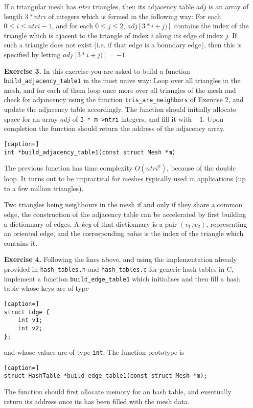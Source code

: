 \documentclass[a4paper,11pt]{article}
\begin{document}
\bigskip
 
If a triangular mesh has $ntri$ triangles, then its adjacency
table $adj$ is an array of length $3 * ntri$ of integers which is formed 
in the following way: For each $0 \leq i \leq ntri - 1$, and for each
$0 \leq j \leq 2$, $adj[3 * i + j)]$ contains the index of the 
triangle which is ajacent to the triangle of index $i$ along its edge of index $j$. 
If such a triangle does not exist (i.e. if that edge is a boundary edge), then
this is specified by letting $adj[3 * i + j)] = -1.$ 

\medskip

{\bf Exercise 3.} In this exercise you are asked to build a function {\tt build\_adjacency\_table1} 
in the most naive way: Loop over all triangles in the mesh, and for each of them
loop once more over all triangles of the mesh and check for adjancency using the 
function {\tt tris\_are\_neighbors} of Exercise 2, and update the adjacency table 
accordingly. The function should initially allocate space for an array $adj$ of
{\tt 3 * m->ntri} integers, and fill it with $-1.$ Upon completion the function should
return the address of the adjacency array. 
\begin{lstlisting}[caption=]
int *build_adjacency_table1(const struct Mesh *m)
\end{lstlisting}

\medskip

The previous function has time complexity $O(ntri^2)$, because of the double loop.
It turns out to be impractical for meshes typically used in applications (up to a 
few million triangles). 

\medskip

Two triangles being neighbours in the mesh if and only if they share a common edge, 
the construction of the adjacency table can be accelerated by first building a dictionnary 
of edges. A {\it key} of that dictionnary is a pair $(v_1,v_2)$, representing an oriented edge, 
and the corresponding {\it value} is the index of the triangle which contains it. 

\medskip

{\bf Exercise 4.} Following the lines above, and using the implementation already provided in 
{\tt hash\_tables.h} and {\tt hash\_tables.c} for generic hash tables in C, implement 
a function {\tt build\_edge\_table1} which initialises and then fill a hash table whose
keys are of type 
\begin{lstlisting}[caption=]
struct Edge {
	int v1;  
	int v2;
};
\end{lstlisting}
and whose values are of type {\tt int}. The function prototype is
\begin{lstlisting}[caption=]
struct HashTable *build_edge_table1(const struct Mesh *m);
\end{lstlisting}
The function should first allocate memory for an hash table, and eventually 
return its address once its has been filled with the mesh data. 
\end{document}
